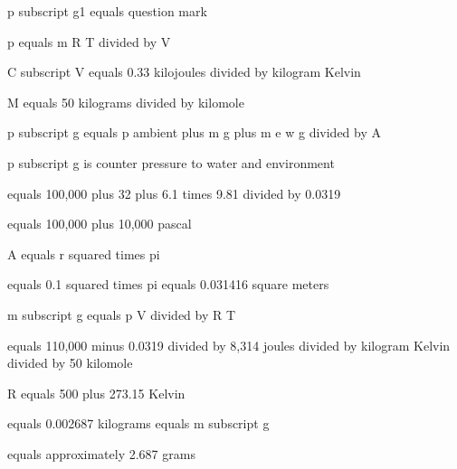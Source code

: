 p subscript g1 equals question mark

p equals m R T divided by V

C subscript V equals 0.33 kilojoules divided by kilogram Kelvin

M equals 50 kilograms divided by kilomole

p subscript g equals p ambient plus m g plus m e w g divided by A

p subscript g is counter pressure to water and environment

equals 100,000 plus 32 plus 6.1 times 9.81 divided by 0.0319

equals 100,000 plus 10,000 pascal

A equals r squared times pi

equals 0.1 squared times pi equals 0.031416 square meters

m subscript g equals p V divided by R T

equals 110,000 minus 0.0319 divided by 8,314 joules divided by kilogram Kelvin divided by 50 kilomole

R equals 500 plus 273.15 Kelvin

equals 0.002687 kilograms equals m subscript g

equals approximately 2.687 grams